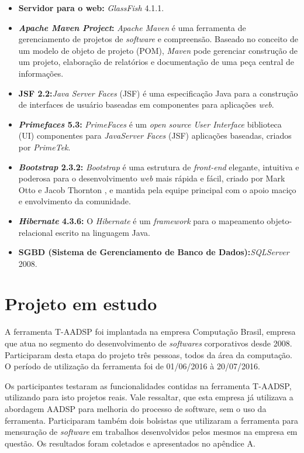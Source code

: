 \documentclass{acm_proc_article-sp}
\begin{document}
\begin{itemize}
\item \textbf{Servidor para o web:} \textit{GlassFish} 4.1.1. 
\item \textbf{\textit{Apache Maven Project}:} \textit{Apache Maven} é uma ferramenta de gerenciamento de projetos de \textit{software} e compreensão. Baseado no conceito de um modelo de objeto de projeto (POM), \textit{Maven} pode gerenciar construção de um projeto, elaboração de relatórios e documentação de uma peça central de informações.
\item \textbf{JSF 2.2:}\textit{Java Server Faces} (JSF) é uma especificação Java para a construção de interfaces de usuário baseadas em componentes para aplicações \textit{web}.
\item \textbf{\textit{Primefaces} 5.3:} \textit{PrimeFaces} é um \textit{open source User Interface} biblioteca (UI) componentes para \textit{JavaServer Faces} (JSF) aplicações baseadas, criados por \textit{PrimeTek}.  
\item \textbf{\textit{Bootstrap} 2.3.2:} \textit{Bootstrap} é uma estrutura de \textit{front-end} elegante, intuitiva e poderosa para o desenvolvimento \textit{web} mais rápida e fácil, criado por Mark Otto e Jacob Thornton , e mantida pela equipe principal com o apoio maciço e envolvimento da comunidade. 
\item \textbf{\textit{Hibernate} 4.3.6:} O \textit{Hibernate} é um \textit{framework} para o mapeamento objeto-relacional escrito na linguagem Java. 
\item \textbf{SGBD (Sistema de Gerenciamento de Banco de Dados):}\textit{SQLServer} 2008. 
\end{itemize}


\section{Projeto em estudo}
A ferramenta T-AADSP foi implantada na empresa Computação Brasil, empresa que atua no segmento do desenvolvimento de \textit{softwares} corporativos desde 2008. Participaram desta etapa do projeto três pessoas, todos da área da computação. O período de utilização da ferramenta foi de 01/06/2016 à 20/07/2016. 

Os participantes testaram as funcionalidades contidas na ferramenta T-AADSP, utilizando para isto projetos reais. Vale ressaltar, que esta empresa já utilizava a abordagem AADSP para melhoria do processo de software, sem o uso da ferramenta. Participaram também dois bolsistas que utilizaram a ferramenta para mensuração de \textit{software} em trabalhos desenvolvidos pelos mesmos na empresa em questão. Os resultados foram coletados e apresentados no apêndice A.
\end{document}
